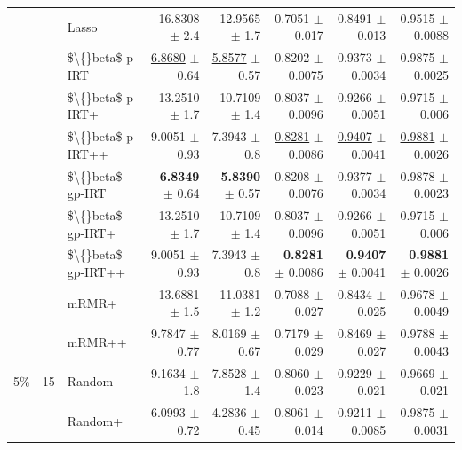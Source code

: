 \begin{longtable}{llp{}rrrrr}
 &  & Lasso & 16.8308 {\scriptsize $\pm$ 2.4} & 12.9565 {\scriptsize $\pm$ 1.7} & 0.7051 {\scriptsize $\pm$ 0.017} & 0.8491 {\scriptsize $\pm$ 0.013} & 0.9515 {\scriptsize $\pm$ 0.0088} \\
 &  & \$\textbackslash\{\}beta\$ p-IRT & \underline{6.8680} {\scriptsize $\pm$ 0.64} & \underline{5.8577} {\scriptsize $\pm$ 0.57} & 0.8202 {\scriptsize $\pm$ 0.0075} & 0.9373 {\scriptsize $\pm$ 0.0034} & 0.9875 {\scriptsize $\pm$ 0.0025} \\
 &  & \$\textbackslash\{\}beta\$ p-IRT+ & 13.2510 {\scriptsize $\pm$ 1.7} & 10.7109 {\scriptsize $\pm$ 1.4} & 0.8037 {\scriptsize $\pm$ 0.0096} & 0.9266 {\scriptsize $\pm$ 0.0051} & 0.9715 {\scriptsize $\pm$ 0.006} \\
 &  & \$\textbackslash\{\}beta\$ p-IRT++ & 9.0051 {\scriptsize $\pm$ 0.93} & 7.3943 {\scriptsize $\pm$ 0.8} & \underline{0.8281} {\scriptsize $\pm$ 0.0086} & \underline{0.9407} {\scriptsize $\pm$ 0.0041} & \underline{0.9881} {\scriptsize $\pm$ 0.0026} \\
 &  & \$\textbackslash\{\}beta\$ gp-IRT & \textbf{6.8349} {\scriptsize $\pm$ 0.64} & \textbf{5.8390} {\scriptsize $\pm$ 0.57} & 0.8208 {\scriptsize $\pm$ 0.0076} & 0.9377 {\scriptsize $\pm$ 0.0034} & 0.9878 {\scriptsize $\pm$ 0.0023} \\
 &  & \$\textbackslash\{\}beta\$ gp-IRT+ & 13.2510 {\scriptsize $\pm$ 1.7} & 10.7109 {\scriptsize $\pm$ 1.4} & 0.8037 {\scriptsize $\pm$ 0.0096} & 0.9266 {\scriptsize $\pm$ 0.0051} & 0.9715 {\scriptsize $\pm$ 0.006} \\
 &  & \$\textbackslash\{\}beta\$ gp-IRT++ & 9.0051 {\scriptsize $\pm$ 0.93} & 7.3943 {\scriptsize $\pm$ 0.8} & \textbf{0.8281} {\scriptsize $\pm$ 0.0086} & \textbf{0.9407} {\scriptsize $\pm$ 0.0041} & \textbf{0.9881} {\scriptsize $\pm$ 0.0026} \\
 &  & mRMR+ & 13.6881 {\scriptsize $\pm$ 1.5} & 11.0381 {\scriptsize $\pm$ 1.2} & 0.7088 {\scriptsize $\pm$ 0.027} & 0.8434 {\scriptsize $\pm$ 0.025} & 0.9678 {\scriptsize $\pm$ 0.0049} \\
 &  & mRMR++ & 9.7847 {\scriptsize $\pm$ 0.77} & 8.0169 {\scriptsize $\pm$ 0.67} & 0.7179 {\scriptsize $\pm$ 0.029} & 0.8469 {\scriptsize $\pm$ 0.027} & 0.9788 {\scriptsize $\pm$ 0.0043} \\
\midrule
5\% & 15 & Random & 9.1634 {\scriptsize $\pm$ 1.8} & 7.8528 {\scriptsize $\pm$ 1.4} & 0.8060 {\scriptsize $\pm$ 0.023} & 0.9229 {\scriptsize $\pm$ 0.021} & 0.9669 {\scriptsize $\pm$ 0.021} \\
 &  & Random+ & 6.0993 {\scriptsize $\pm$ 0.72} & 4.2836 {\scriptsize $\pm$ 0.45} & 0.8061 {\scriptsize $\pm$ 0.014} & 0.9211 {\scriptsize $\pm$ 0.0085} & 0.9875 {\scriptsize $\pm$ 0.0031} \\

\end{longtable}
